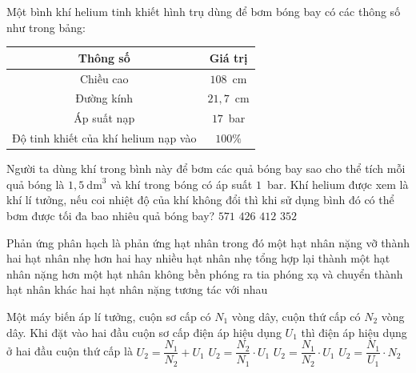 	\begin{ex}%
		Một bình khí helium tinh khiết hình trụ dùng để bơm bóng bay có các thông số như trong bảng:
		\begin{center}
			{\renewcommand{\arraystretch}{1.2}%
			\begin{tabular}{|c|c|}
				\hline
				\textbf{Thông số} & \textbf{Giá trị}\\
				\hline
				Chiều cao & $108$~cm\\
				\hline
				Đường kính & $21{,}7$~cm\\
				\hline
				Áp suất nạp & $17$~bar\\
				\hline
				Độ tinh khiết của khí helium nạp vào & $100\%$\\
				\hline
			\end{tabular}}
		\end{center}
		Người ta dùng khí trong bình này để bơm các quả bóng bay sao cho thể tích mỗi quả bóng là $1{,}5~\text{dm}^3$ và khí trong bóng có áp suất $1$~bar. Khí helium được xem là khí lí tưởng, nếu coi nhiệt độ của khí không đổi thì khi sử dụng bình đó có thể bơm được tối đa bao nhiêu quả bóng bay?
		\choice
		{$571$}
		{\True $426$}
		{$412$}
		{$352$}
	\end{ex}

	\begin{ex}%
		Phản ứng phân hạch là phản ứng hạt nhân trong đó
		\choice
		{\True một hạt nhân nặng vỡ thành hai hạt nhân nhẹ hơn}
		{hai hay nhiều hạt nhân nhẹ tổng hợp lại thành một hạt nhân nặng hơn}
		{một hạt nhân không bền phóng ra tia phóng xạ và chuyển thành hạt nhân khác}
		{hai hạt nhân nặng tương tác với nhau}
	\end{ex}

	\begin{ex}%
		Một máy biến áp lí tưởng, cuộn sơ cấp có $N_1$ vòng dây, cuộn thứ cấp có $N_2$ vòng dây. Khi đặt vào hai đầu cuộn sơ cấp điện áp hiệu dụng $U_1$ thì điện áp hiệu dụng ở hai đầu cuộn thứ cấp là
		\choice
		{$U_2=\dfrac{N_1}{N_2}+U_1$}
		{\True $U_2=\dfrac{N_2}{N_1}\cdot U_1$}
		{$U_2=\dfrac{N_1}{N_2}\cdot U_1$}
		{$U_2=\dfrac{N_1}{U_1}\cdot N_2$}
	\end{ex}

